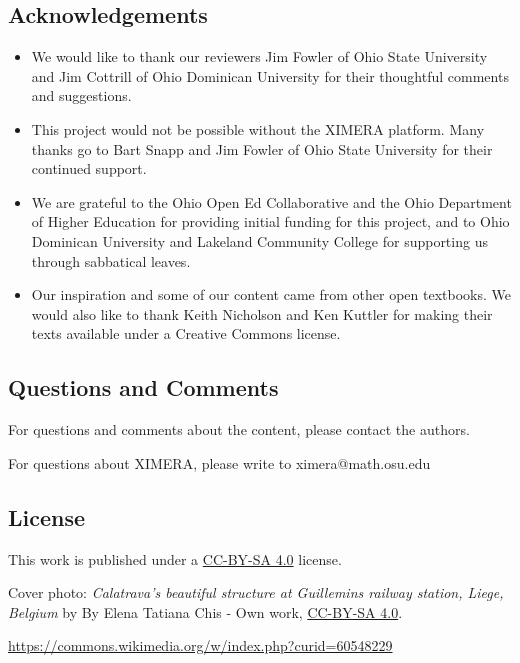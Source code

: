 \documentclass{ximera}
\begin{document}
\subsection{Acknowledgements}
\begin{itemize}
\item
We would like to thank our reviewers Jim Fowler of Ohio State University and Jim Cottrill of Ohio Dominican University for their thoughtful comments and suggestions.  
\item This project would not be possible without the XIMERA platform.  Many thanks go to Bart Snapp and Jim Fowler of Ohio State University for their continued support.   
\item We are grateful to the Ohio Open Ed Collaborative and the Ohio Department of Higher Education for providing initial funding for this project, and to Ohio Dominican University and Lakeland Community College for supporting us through sabbatical leaves.
\item Our inspiration and some of our content came from other open textbooks. We would also like to thank Keith Nicholson and Ken Kuttler for making their texts available under a Creative Commons license.
\end{itemize}

\subsection{Questions and Comments}
For questions and comments about the content, please contact the authors.

For questions about XIMERA, please write to ximera@math.osu.edu

\subsection{License}
This work is published under a \href{https://creativecommons.org/licenses/by-sa/4.0/deed.en}{CC-BY-SA 4.0} license.

Cover photo:  {\it Calatrava's beautiful structure at Guillemins railway station, Liege, Belgium} by By Elena Tatiana Chis - Own work, \href{https://creativecommons.org/licenses/by-sa/4.0/deed.en}{CC-BY-SA 4.0}.  

\href{https://commons.wikimedia.org/w/index.php?curid=60548229}{https://commons.wikimedia.org/w/index.php?curid=60548229}
\end{document}
